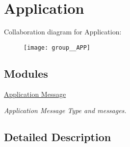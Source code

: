 \hypertarget{group__APP}{}\section{Application}
\label{group__APP}
Collaboration diagram for Application\+:\nopagebreak
\begin{figure}[H]
\begin{center}
\leavevmode
\texttt{[image: group\_\_APP]}
\end{center}
\end{figure}
\subsection*{Modules}
\begin{DoxyCompactItemize}
\item 
\hyperlink{group__APP__MSG}{Application Message}
\begin{DoxyCompactList}\small\item\em Application Message Type and messages. \end{DoxyCompactList}\end{DoxyCompactItemize}


\subsection{Detailed Description}
